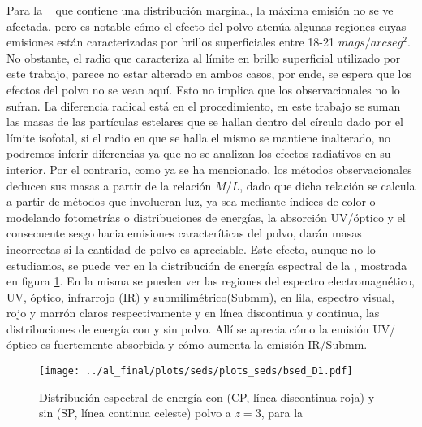 Para la \bcg~ que contiene una distribuci\'on marginal,
la m\'axima emisi\'on no se ve afectada, pero es notable c\'omo el
efecto del polvo aten\'ua algunas regiones 
cuyas emisiones est\'an caracterizadas por brillos superficiales
entre 18-21 $mags/arcseg^{2}$.
No obstante, el radio que caracteriza al l\'imite
en brillo superficial utilizado por este trabajo, parece no estar alterado en ambos casos,
por ende, se espera
que los efectos del polvo no se vean aqu\'i. Esto no implica que los observacionales no lo sufran. La diferencia radical
est\'a en el procedimiento, en este trabajo se suman las masas de las part\'iculas estelares que se hallan dentro del
c\'irculo dado por el l\'imite isofotal, si el radio en que se halla el mismo se mantiene inalterado,
no podremos inferir diferencias ya que no se analizan los efectos radiativos en su interior. Por el contrario,
como ya se ha mencionado, los m\'etodos observacionales 
deducen sus masas a partir de la relaci\'on $M/L$, dado que
dicha relaci\'on se calcula a partir de m\'etodos que involucran luz, ya sea
mediante \'indices de color o modelando fotometr\'ias o distribuciones de energ\'ias,
la absorci\'on UV/\'optico y el consecuente sesgo hacia emisiones caracter\'iticas del polvo,
dar\'an masas incorrectas si la cantidad de polvo es apreciable. Este
efecto, aunque no lo estudiamos, se puede ver en la distribuci\'on de energ\'ia espectral de la , mostrada en figura \ref{fig:seds}.
En la misma se pueden ver las regiones del espectro electromagn\'etico, UV, \'optico, infrarrojo (IR) y submilim\'etrico(Submm), en lila, espectro visual,
rojo y marr\'on claros respectivamente y en l\'inea discontinua y continua, las distribuciones de energ\'ia con y sin polvo. 
All\'i se aprecia c\'omo la emisi\'on UV/\'optico es fuertemente absorbida y c\'omo aumenta la emisi\'on IR/Submm. 


\begin{figure}[H]
\centering
 \texttt{[image: ../al\_final/plots/seds/plots\_seds/bsed\_D1.pdf]}
\caption{Distribuci\'on espectral de energ\'ia con (CP, l\'inea discontinua roja) y sin (SP, l\'inea continua celeste) polvo a $z=3$, para la }
\label{fig:seds}
\end{figure}

